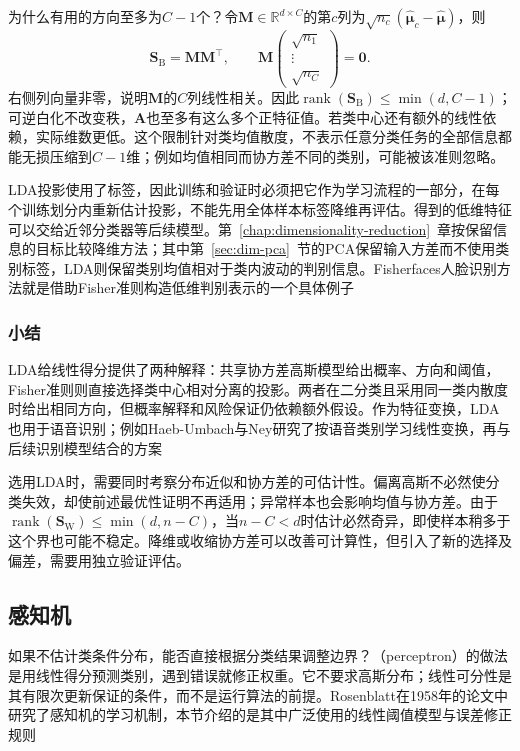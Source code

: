 为什么有用的方向至多为$C-1$个？令$\bm{M}\in\mathbb{R}^{d\times C}$的第$c$列为$\sqrt{n_c}(\hat{\bm{\mu}}_c-\hat{\bm{\mu}})$，则
\[
  \bm{S}_{\mathrm{B}}=\bm{M}\bm{M}^{\top},\qquad
  \bm{M}
  \begin{pmatrix}\sqrt{n_1}\\ \vdots\\ \sqrt{n_C}\end{pmatrix}
  =\bm{0}.
\]
右侧列向量非零，说明$\bm{M}$的$C$列线性相关。因此$\operatorname{rank}(\bm{S}_{\mathrm{B}})\leq\min(d,C-1)$；可逆白化不改变秩，$\bm{A}$也至多有这么多个正特征值。若类中心还有额外的线性依赖，实际维数更低。这个限制针对类均值散度，不表示任意分类任务的全部信息都能无损压缩到$C-1$维；例如均值相同而协方差不同的类别，可能被该准则忽略。

LDA投影使用了标签，因此训练和验证时必须把它作为学习流程的一部分，在每个训练划分内重新估计投影，不能先用全体样本标签降维再评估。得到的低维特征可以交给近邻分类器等后续模型。第~\ref{chap:dimensionality-reduction}~章按保留信息的目标比较降维方法；其中第~\ref{sec:dim-pca}~节的PCA保留输入方差而不使用类别标签，LDA则保留类别均值相对于类内波动的判别信息。Fisherfaces人脸识别方法就是借助Fisher准则构造低维判别表示的一个具体例子

\subsubsection{小结}
\label{sec:classification-lda-summary}

LDA给线性得分提供了两种解释：共享协方差高斯模型给出概率、方向和阈值，Fisher准则则直接选择类中心相对分离的投影。两者在二分类且采用同一类内散度时给出相同方向，但概率解释和风险保证仍依赖额外假设。作为特征变换，LDA也用于语音识别；例如Haeb-Umbach与Ney研究了按语音类别学习线性变换，再与后续识别模型结合的方案

选用LDA时，需要同时考察分布近似和协方差的可估计性。偏离高斯不必然使分类失效，却使前述最优性证明不再适用；异常样本也会影响均值与协方差。由于$\operatorname{rank}(\bm{S}_{\mathrm{W}})\leq\min(d,n-C)$，当$n-C<d$时估计必然奇异，即使样本稍多于这个界也可能不稳定。降维或收缩协方差可以改善可计算性，但引入了新的选择及偏差，需要用独立验证评估。

\subsection{感知机}
\label{sec:classification-perceptron}

如果不估计类条件分布，能否直接根据分类结果调整边界？（perceptron）的做法是用线性得分预测类别，遇到错误就修正权重。它不要求高斯分布；线性可分性是其有限次更新保证的条件，而不是运行算法的前提。Rosenblatt在1958年的论文中研究了感知机的学习机制，本节介绍的是其中广泛使用的线性阈值模型与误差修正规则


